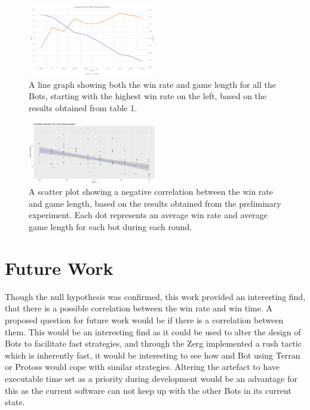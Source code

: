 \documentclass[journal]{IEEEtran}
\begin{document}
\begin{figure}[H]
	\centering
	\includegraphics[width=0.5\textwidth]{WinTimeLineWithBot}
	\caption{A line graph showing both the win rate and game length for all the Bots, starting with the highest win rate on the left, based on the results obtained from table 1.}
	\label{Fig7}
\end{figure}
\begin{figure}[H]
	\centering
	\includegraphics[width=0.5\textwidth]{ScatterWinvsDurLine}
	\caption{A scatter plot showing a negative correlation between the win rate and game length, based on the results obtained from the preliminary experiment. Each dot represents an average win rate and average game length for each bot during each round.}
	\label{Fig8}
\end{figure}




\section{Future Work}
Though the null hypothesis was confirmed, this work provided an interesting find, that there is a possible correlation between the win rate and win time. A proposed question for future work would be if there is a correlation between them. This would be an interesting find as it could be used to alter the design of Bots to facilitate fast strategies, and through the Zerg implemented a rush tactic which is inherently fast, it would be interesting to see how and Bot using Terran or Protoss would cope with similar strategies.
Altering the artefact to have executable time set as a priority during development would be an advantage for this as the current software can not keep up with the other Bots in its current state.
\end{document}
